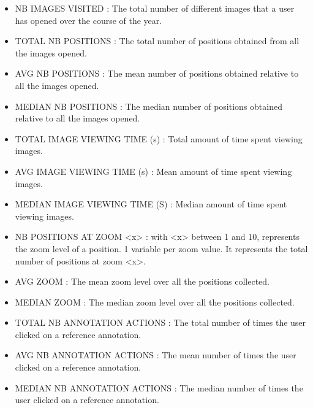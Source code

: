 \documentclass[a4paper,11pt]{report}
\numberwithin{figure}{section} %
\begin{document}
   \begin{itemize}
    \item[\textbullet] NB IMAGES VISITED : The total number of different images that a user has opened over the course of the year.\\
    \item[\textbullet] TOTAL NB POSITIONS : The total number of positions obtained from all the images opened.\\
    \item[\textbullet] AVG NB POSITIONS : The mean number of positions obtained relative to all the images opened.\\
    
    \item[\textbullet] MEDIAN NB POSITIONS : The median number of positions  obtained relative to all the images opened.\\
    \item[\textbullet] TOTAL IMAGE VIEWING TIME (s) : Total amount of time spent viewing images.\\

    \item[\textbullet] AVG IMAGE VIEWING TIME (s) : Mean amount of time spent viewing images.\\

    \item[\textbullet] MEDIAN IMAGE VIEWING TIME (S) : Median amount of time spent viewing images.\\

    \item[\textbullet] NB POSITIONS AT ZOOM <x> : with <x> between 1 and 10, represents the zoom level of a position. 1 variable per zoom value. It represents the total number of positions at zoom <x>.\\
    \item[\textbullet] AVG ZOOM : The mean zoom level over all the positions collected.\\
    \item[\textbullet] MEDIAN ZOOM : The median zoom level over all the positions collected.\\
    \item[\textbullet] TOTAL NB ANNOTATION ACTIONS : The total number of times the user clicked on a reference annotation.\\
    \item[\textbullet] AVG NB ANNOTATION ACTIONS : The mean number of times the user clicked on a reference annotation.\\
    \item[\textbullet] MEDIAN NB ANNOTATION ACTIONS : The median number of times the user clicked on a reference annotation.\\
    

\end{itemize}
\end{document}
